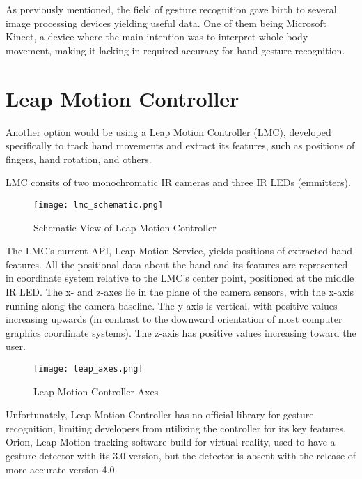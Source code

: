As previously mentioned, the field of gesture recognition gave birth to several image processing devices yielding useful data. One of them being Microsoft Kinect, a device where the main intention was to interpret whole-body movement, making it lacking in required accuracy for hand gesture recognition. 

\section{Leap Motion Controller}
Another option would be using a Leap Motion Controller (LMC), developed specifically to track hand movements and extract its features, such as positions of fingers, hand rotation, and others.

LMC consits of two monochromatic IR cameras and three IR LEDs (emmitters). 

\begin{figure}[h]
	\centering
    \texttt{[image: lmc\_schematic.png]}
	\caption{Schematic View of Leap Motion Controller}
	\label{fig:lmcScheme}
\end{figure}



The LMC's current API, Leap Motion Service, yields positions of extracted hand features. All the positional data about the hand and its features are represented in coordinate system relative to the LMC's center point, positioned at the middle IR LED.\cite{LMCanalysis} The x- and z-axes lie in the plane of the camera sensors, with the x-axis running along the camera baseline. The y-axis is vertical, with positive values increasing upwards (in contrast to the downward orientation of most computer graphics coordinate systems). The z-axis has positive values increasing toward the user.\cite{tomasMultileap}

\begin{figure}[h]
	\centering
    \texttt{[image: leap\_axes.png]}
	\caption{Leap Motion Controller Axes}
	\label{fig:lmcScheme}
\end{figure}


Unfortunately, Leap Motion Controller has no official library for gesture recognition, limiting developers from utilizing the controller for its key features. Orion, Leap Motion tracking software build for virtual reality, used to have a gesture detector with its 3.0 version, but the detector is absent with the release of more accurate version 4.0.